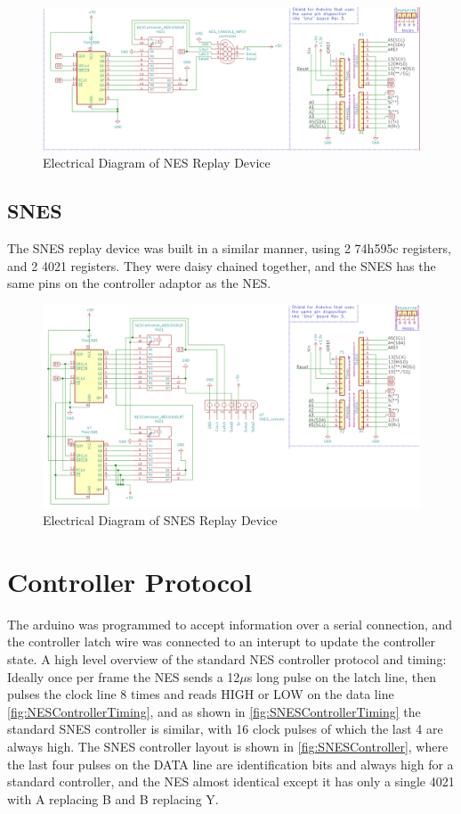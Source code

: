 \documentclass{article}
\begin{document}
\begin{figure}
  \includegraphics[width=\linewidth]{NESTASReplay.png}
  \caption{Electrical Diagram of NES Replay Device}
  \label{fig:NESReplay}
\end{figure}

\subsection{SNES}
The SNES replay device was built in a similar manner, using 2 74h595c registers, and 2 4021 registers.  They were daisy chained together, and the SNES has the same pins on the controller adaptor as the NES.  

\begin{figure}[h]
   \includegraphics[width=\linewidth]{SNESTASReplay.png}
   \caption{Electrical Diagram of SNES Replay Device}
   \label{fig:SNESReplay}
\end{figure}

\section{Controller Protocol}
The arduino was programmed to accept information over a serial connection, and the controller latch wire was connected to an interupt to update the controller state.  A high level overview of the standard NES controller protocol and timing: Ideally once per frame the NES sends a 12$\mu$s long pulse on the latch line, then pulses the clock line 8 times and reads HIGH or LOW on the data line \ref{fig:NESControllerTiming}, and as shown in \ref{fig:SNESControllerTiming} the standard SNES controller is similar, with 16 clock pulses of which the last 4 are always high. The SNES controller layout is shown in \ref{fig:SNESController}, where the last four pulses on the DATA line are identification bits and always high for a standard controller, and the NES almost identical except it has only a single 4021 with A replacing B and B replacing Y.
\end{document}

